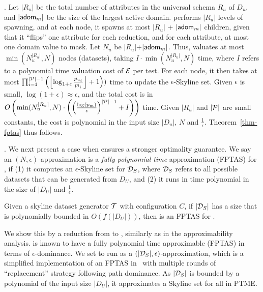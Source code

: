 . 
Let $|R_u|$ be the total number of 
attributes in the universal schema 
$R_u$ of $D_u$, and $|\ad_m|$ be the size of the largest active domain. \apxmodis performs 
$|R_u|$ levels of  
spawning, and at each node, 
it spawns at most $|R_u|$ + $|\ad_m|$ 
children, given that it 
``flips'' one attribute for each reduction, and for 
each attribute, at most one domain value 
to mask. Let $N_u$ be $|R_u|$+$|\ad_m|$. 
Thus, \apxmodis valuates 
at most $\min(N_u^{|R_u|}, N)$ 
nodes (datasets), taking $I\cdot \min(N_u^{|R_u|}, N)$ 
time, where $I$ 
refers to a polynomial time 
valuation cost of $\E$ per test. 
For each node, it then takes at most $\prod_{i=1}^{|\P|-1}\left(\left\lfloor\log _{1+\epsilon}\frac{p_{u_i}}{p_{l_i}}\right\rfloor+1\right))$ 
time to update the $\epsilon$-Skyline set. 
Given $\epsilon$ is small, $\log (1 + \epsilon) \approx \epsilon$, and the total cost is 
in $O\left(\min(N_u^{|R_u|}, N)\cdot \left(\left(\frac{\log(p_m)}{\epsilon}\right)^{|\P|-1}+I\right)\right)$ time. 
Given $|R_u|$ and $|\P|$ are small constants, 
the cost is polynomial in the 
input size $|D_u|$, $N$ and $\frac{1}{\epsilon}$. 
Theorem~\ref{thm-fptas} thus follows. 

. 
We next present a case when \apxmodis 
ensures a stronger optimality guarantee. 
We say an $(N, \epsilon)$-approximation 
is a {\em fully polynomial time} approximation (FPTAS) 
for \modis, if 
(1) it computes 
an $\epsilon$-Skyline set 
for $\D_S$, where $\D_S$ 
refers to all possible datasets 
that can be generated from $D_U$, 
and (2) it runs in 
time polynomial in the size of 
$|D_U|$ and $\frac{1}{\epsilon}$. 


\begin{lemma}
\label{cor-fptas}
Given a skyline dataset generator $\T$ with configuration $C$, 
if $|\D_S|$ has a size that is polynomially bounded in $O(f(|D_U|))$, 
then \apxmodis is an FPTAS for \modis. 
\end{lemma}

\begin{proofS}
We show this by a reduction from 
\modis to \mos, similarly as 
in the approximability analysis. \mos 
is known to have a fully polynomial 
time approximable (FPTAS) in terms of 
$\epsilon$-dominance. We set \apxmodis to run as 
a $(|\D_S|, \epsilon)$-approximation, 
which is a simplified implementation of an  
FPTAS in~\cite{tsaggouris2009multiobjective} with multiple 
rounds of ``replacement'' 
strategy following path dominance. 
As 
$|\D_S|$ is bounded by a polynomial of  
the input size $|D_U|$, 
it approximates 
a Skyline set for all in PTME. 
\end{proofS}


